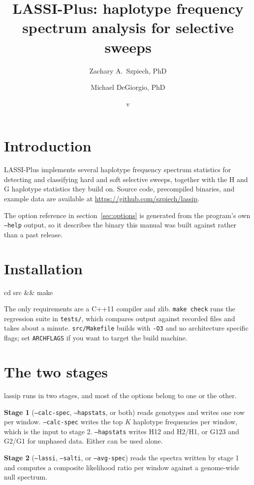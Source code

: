 \documentclass[11pt]{article}
\title{LASSI-Plus: haplotype frequency spectrum analysis for selective sweeps}
\author{Zachary A.\ Szpiech, PhD \and Michael DeGiorgio, PhD}
\date{v\lassipversion}
\newcommand{\opt}[1]{\texttt{#1}}
\begin{document}
\maketitle

\tableofcontents

\section{Introduction}

LASSI-Plus implements several haplotype frequency spectrum statistics for
detecting and classifying hard and soft selective sweeps, together with the H
and G haplotype statistics they build on. Source code, precompiled binaries,
and example data are available at
\url{https://github.com/szpiech/lassip}.

The option reference in section~\ref{sec:options} is generated from the
program's own \opt{--help} output, so it describes the binary this manual was
built against rather than a past release.

\section{Installation}

\begin{shell}
cd src && make
\end{shell}

The only requirements are a C++11 compiler and zlib. \texttt{make check} runs
the regression suite in \texttt{tests/}, which compares output against
recorded files and takes about a minute. \texttt{src/Makefile} builds with
\texttt{-O3} and no architecture specific flags; set \texttt{ARCHFLAGS} if you
want to target the build machine.

\section{The two stages}

lassip runs in two stages, and most of the options belong to one or the other.

\textbf{Stage 1} (\opt{--calc-spec}, \opt{--hapstats}, or both) reads genotypes
and writes one row per window. \opt{--calc-spec} writes the top $K$ haplotype
frequencies per window, which is the input to stage 2. \opt{--hapstats} writes
H12 and H2/H1, or G123 and G2/G1 for unphased data. Either can be used alone.

\textbf{Stage 2} (\opt{--lassi}, \opt{--salti}, or \opt{--avg-spec}) reads the
spectra written by stage 1 and computes a composite likelihood ratio per window
against a genome-wide null spectrum.
\end{document}
